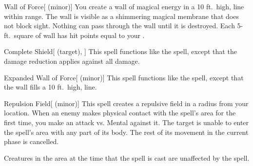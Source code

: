 \lowercase{\hypertarget{spell:Wall of Force}{}}\label{spell:Wall of Force}
\begin{freeability}[\nth{1}]{\hypertarget{spell:Wall of Force}{Wall of Force}}[ (minor)]
You create a wall of magical energy in a 10 ft.\ high, \areamed line within \rngmed range.
The wall is visible as a shimmering magical membrane that does not block sight.
Nothing can pass through the wall until it is destroyed.
Each 5-ft.\ square of wall has hit points equal to your .
\end{freeability}
\vspace{0.25em}



\lowercase{\hypertarget{spell:Complete Shield}{}}\label{spell:Complete Shield}
\begin{attuneability}[\nth{2}]{\hypertarget{spell:Complete Shield}{Complete Shield}}[ (target), ]
This spell functions like the  spell, except that the damage reduction applies against all damage.
\end{attuneability}
\vspace{0.25em}



\lowercase{\hypertarget{spell:Expanded Wall of Force}{}}\label{spell:Expanded Wall of Force}
\begin{freeability}[\nth{2}]{\hypertarget{spell:Expanded Wall of Force}{Expanded Wall of Force}}[ (minor)]
This spell functions like the  spell, except that the wall fills a 10 ft.\ high, \arealarge line.
\end{freeability}
\vspace{0.25em}



\lowercase{\hypertarget{spell:Repulsion Field}{}}\label{spell:Repulsion Field}
\begin{freeability}[\nth{2}]{\hypertarget{spell:Repulsion Field}{Repulsion Field}}[ (minor)]
This spell creates a repulsive field in a \areamed radius  from your location.
When an enemy makes physical contact with the spell's area for the first time, you make an attack vs. Mental against it.
\hit The target is unable to enter the spell's area with any part of its body.
The rest of its movement in the current phase is cancelled.

Creatures in the area at the time that the spell is cast are unaffected by the spell.
\end{freeability}
\vspace{0.25em}




